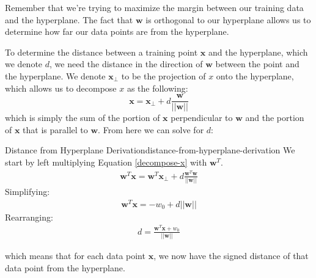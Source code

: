 Remember that we're trying to maximize the margin between our training data and the hyperplane. The fact that $\textbf{w}$ is orthogonal to our hyperplane allows us to determine how far our data points are from the hyperplane.

To determine the distance between a training point $\textbf{x}$ and the hyperplane, which we denote $d$, we need the distance in the direction of $\textbf{w}$ between the point and the hyperplane. We denote $\textbf{x}_{\perp}$ to be the projection of $x$ onto the hyperplane, which allows us to decompose $x$ as the following:
\begin{equation} \label{decompose-x}
	\textbf{x} = \textbf{x}_{\perp} + d \frac{\textbf{w}}{|| \textbf{w} ||}
\end{equation}
which is simply the sum of the portion of $\textbf{x}$ perpendicular to $\textbf{w}$ and the portion of $\textbf{x}$ that is parallel to $\textbf{w}$. From here we can solve for $d$:
\begin{derivation}{Distance from Hyperplane Derivation}{distance-from-hyperplane-derivation}
	We start by left multiplying Equation \ref{decompose-x} with $\textbf{w}^{T}$.
	\begin{align*}
		\textbf{w}^{T}\textbf{x} = \textbf{w}^{T}\textbf{x}_{\perp} + d \frac{\textbf{w}^{T}\textbf{w}}{||\textbf{w}||}
	\end{align*}
	Simplifying:
	\begin{align*}
		\textbf{w}^{T}\textbf{x} =  - w_{0} + d ||\textbf{w}||
	\end{align*}
	Rearranging:
	\begin{align*}
		d = \frac{\textbf{w}^{T}\textbf{x} + w_{0}}{||\textbf{w}||}
	\end{align*}
\end{derivation}
which means that for each data point $\textbf{x}$, we now have the signed distance of that data point from the hyperplane.

